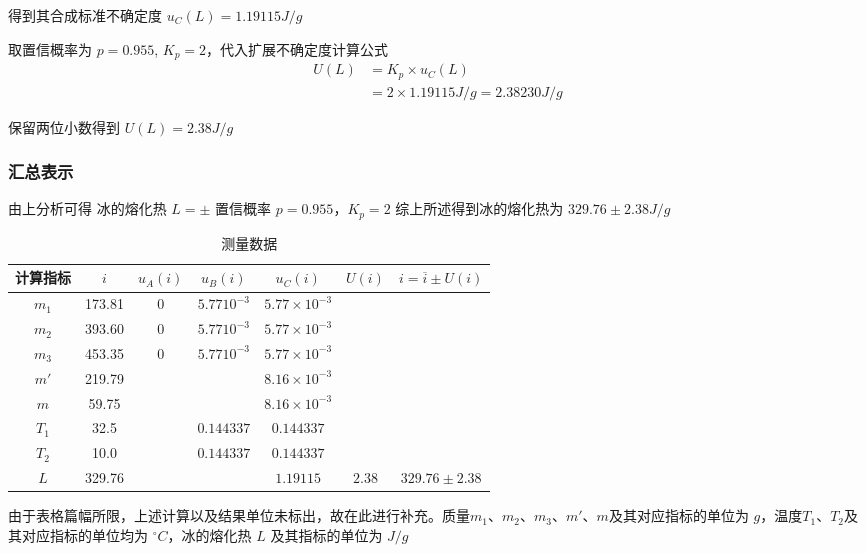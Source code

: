 \documentclass[UTF8]{ctexart}
\begin{document}
得到其合成标准不确定度 $u_C(L) = 1.19115 J/g$

取置信概率为 $p = 0.955$, $K_p = 2$，代入扩展不确定度计算公式
\begin{align*}
    U(L) &= K_p \times u_C(L)  \\
    &= 2 \times 1.19115J/g = 2.38230 J/g
\end{align*}

保留两位小数得到 $U(L) = 2.38 J/g $

\subsubsection{汇总表示}
由上分析可得 冰的熔化热 $L =  \pm $ 置信概率 $p= 0.955$，$K_p = 2$
综上所述得到冰的熔化热为 $329.76 \pm 2.38 J/g$

\begin{table}[H]
\centering
\caption*{测量数据}
\begin{tabular}{c|c|c|c|c|c|c}
\toprule[1pt]
\midrule
     计算指标 & $i$ & $u_A(i)$ & $u_B(i)$ & $u_C(i)$ & $U(i)$  & $i=\overline{i} \pm U(i)$ \\
\midrule
 $m_1$ & 173.81 & 0  & $5.7710^{-3}$ & $5.77 \times 10^{-3}$  & & \\
\midrule
 $m_2$ & 393.60 & 0  & $5.7710^{-3}$  & $5.77\times 10^{-3}$  & & \\
\midrule 
$m_3$ & 453.35& 0  &  $5.7710^{-3}$ &  $5.77 \times 10^{-3}$ & & \\
\midrule
 $m'$ & 219.79 &   &  & $8.16 \times 10^{-3}$ &  & \\
\midrule
 $m$ & 59.75 &  & & $8.16 \times 10^{-3}$ & & \\
\midrule
 $T_1$ & 32.5 &  & $0.144337$ &  $0.144337$ & & \\
\midrule
 $T_2$ & 10.0& &  $0.144337$ &  $0.144337$ &  & \\
\midrule
 $L$ & 329.76 &  & & $1.19115$  & $2.38$ & $329.76 \pm 2.38$ \\
\midrule
\bottomrule[1pt]
\end{tabular}
\end{table}

由于表格篇幅所限，上述计算以及结果单位未标出，故在此进行补充。质量$m_1$、$m_2$、$m_3$、$m'$、$m$及其对应指标的单位为 $g$，温度$T_1$、$T_2$及其对应指标的单位均为 $^{\circ}C$，冰的熔化热 $L$ 及其指标的单位为 $J/g$
\end{document}
